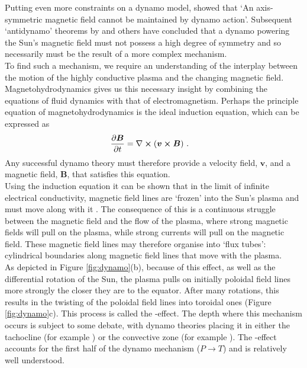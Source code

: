 \documentclass[11pt,a4paper,onecolumn]{report}
\begin{document}
Putting even more constraints on a dynamo model, \citet{cowling1933} showed that
`An axis-symmetric magnetic field cannot be maintained by dynamo action'.
Subsequent `antidynamo' theorems by \citet{backus1956} and others have
concluded that a dynamo powering the Sun's magnetic field must not possess a
high degree of symmetry and so necessarily must be the result of a more complex
mechanism.\\


To find such a mechanism, we require an understanding of the interplay between the
motion of the highly conductive plasma and the changing magnetic field.
Magnetohydrodynamics gives us this necessary insight by combining the
equations of fluid dynamics with that of electromagnetism. Perhaps the principle
equation of magnetohydrodynamics is the ideal induction equation, which can be expressed as
\begin{align}
  \partialderivative{\bm{B}}{t} &=
  \nabla \crossproduct \left(\bm{v}\crossproduct \bm{B}\right)\,.
  \label{eqn:ideal_induction}
\end{align}
Any successful dynamo theory must therefore provide a
velocity field, \(\bm{v}\), and a magnetic field, \(\bm{B}\), that satisfies
this equation. \\

Using the induction equation it can be shown that in the limit of infinite
electrical conductivity, magnetic field lines are `frozen' into the Sun's plasma
and must move along with it \citep{Alfven1943}. The consequence of this is a
continuous struggle between the magnetic field and the flow of the plasma, where
strong magnetic fields will pull on the plasma, while strong currents will pull
on the magnetic field. These magnetic field lines may therefore organise into
`flux tubes': cylindrical boundaries along magnetic field lines that move with
the plasma. \\

As depicted in Figure \ref{fig:dynamo}(b), because of this effect, as well as
the differential rotation of the Sun, the plasma pulls on initially poloidal
field lines more strongly the closer they are to the equator. After many
rotations, this results in the twisting of the poloidal field lines into
toroidal ones (Figure \ref{fig:dynamo}c). This process is called the
\textomega-effect. The depth where this mechanism occurs is subject to some
debate, with dynamo theories placing it in either the tachocline (for example
\citealt{deluca_dynamo_1988}) or the convective zone (for example
\citealp{chen_emergence_2017}). The \textomega-effect accounts for the first
half of the dynamo mechanism (\(P \rightarrow T\)) and is relatively well
understood.\\
\end{document}
